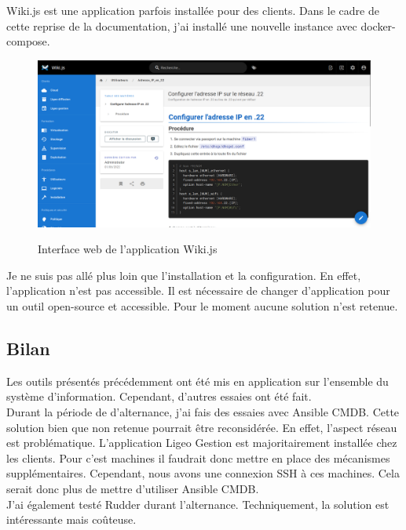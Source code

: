 \documentclass[12pt]{article}
\begin{document}
Wiki.js est une application parfois installée pour des clients. 
Dans le cadre de cette reprise de la documentation, j'ai installé une nouvelle instance avec docker-compose.

\begin{figure}[!ht]
    \centering
    \includegraphics[width=\textwidth]{src/interface_wikijs.png}
    \label{fig:interface_wikijs}
    \caption{Interface web de l'application Wiki.js}
\end{figure}

Je ne suis pas allé plus loin que l'installation et la configuration.
En effet, l'application n'est pas accessible.
Il est nécessaire de changer d'application pour un outil open-source et accessible.
Pour le moment aucune solution n'est retenue.

\newpage
\subsection{Bilan}
Les outils présentés précédemment ont été mis en application sur l'ensemble du système d'information. 
Cependant, d'autres essaies ont été fait. \\

Durant la période de d'alternance, j'ai fais des essaies avec \gls{Ansible CMDB}. 
Cette solution bien que non retenue pourrait être reconsidérée. 
En effet, l'aspect réseau est problématique.
L'application Ligeo Gestion est majoritairement installée chez les clients.
Pour c'est machines il faudrait donc mettre en place des mécanismes supplémentaires.
Cependant, nous avons une connexion SSH à ces machines.
Cela serait donc plus de mettre d'utiliser \gls{Ansible CMDB}. \\

J'ai également testé Rudder durant l'alternance. 
Techniquement, la solution est intéressante mais coûteuse. \\
\end{document}
